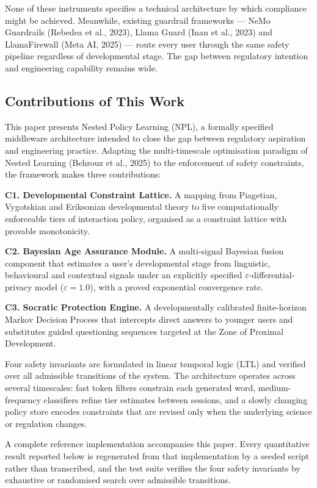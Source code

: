 \documentclass[fleqn,10pt]{wlscirep}
\begin{document}
None of these instruments specifies a technical architecture by which compliance might be achieved. Meanwhile, existing guardrail frameworks --- NeMo Guardrails (Rebedea et al., 2023)\cite{Rebedea2023}, Llama Guard (Inan et al., 2023)\cite{Inan2023} and LlamaFirewall (Meta AI, 2025)\cite{MetaAI2025} --- route every user through the same safety pipeline regardless of developmental stage. The gap between regulatory intention and engineering capability remains wide.

\subsection*{Contributions of This Work}

This paper presents Nested Policy Learning (NPL), a formally specified middleware architecture intended to close the gap between regulatory aspiration and engineering practice. Adapting the multi-timescale optimisation paradigm of Nested Learning (Behrouz et al., 2025)\cite{Behrouz2025} to the enforcement of safety constraints, the framework makes three contributions:

\textbf{C1. Developmental Constraint Lattice.} A mapping from Piagetian, Vygotskian and Eriksonian developmental theory to five computationally enforceable tiers of interaction policy, organised as a constraint lattice with provable monotonicity.

\textbf{C2. Bayesian Age Assurance Module.} A multi-signal Bayesian fusion component that estimates a user's developmental stage from linguistic, behavioural and contextual signals under an explicitly specified $\varepsilon$-differential-privacy model ($\varepsilon = 1.0$), with a proved exponential convergence rate.

\textbf{C3. Socratic Protection Engine.} A developmentally calibrated finite-horizon Markov Decision Process that intercepts direct answers to younger users and substitutes guided questioning sequences targeted at the Zone of Proximal Development.

Four safety invariants are formulated in linear temporal logic (LTL) and verified over all admissible transitions of the system. The architecture operates across several timescales: fast token filters constrain each generated word, medium-frequency classifiers refine tier estimates between sessions, and a slowly changing policy store encodes constraints that are revised only when the underlying science or regulation changes.

A complete reference implementation accompanies this paper. Every quantitative result reported below is regenerated from that implementation by a seeded script rather than transcribed, and the test suite verifies the four safety invariants by exhaustive or randomised search over admissible transitions.
\end{document}
